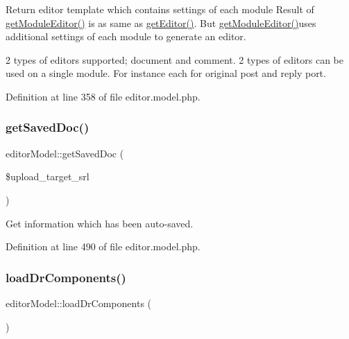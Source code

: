 Return editor template which contains settings of each module Result of \hyperlink{classeditorModel_af2b57078eb05b65c0094d5dac0186ca5}{get\+Module\+Editor()} is as same as \hyperlink{classeditorModel_a77477c0a6d333b3230f77904d96d93c5}{get\+Editor()}. But \hyperlink{classeditorModel_af2b57078eb05b65c0094d5dac0186ca5}{get\+Module\+Editor()}uses additional settings of each module to generate an editor. 

2 types of editors supported; document and comment. 2 types of editors can be used on a single module. For instance each for original post and reply port. 

Definition at line 358 of file editor.\+model.\+php.

\mbox{\label{classeditorModel_af9c4c2f7ba2d377b087cac08412b0baa}} 
\subsubsection{\texorpdfstring{get\+Saved\+Doc()}{getSavedDoc()}}
{\footnotesize\ttfamily editor\+Model\+::get\+Saved\+Doc (\begin{DoxyParamCaption}\item[{}]{\$upload\+\_\+target\+\_\+srl }\end{DoxyParamCaption})}



Get information which has been auto-\/saved. 



Definition at line 490 of file editor.\+model.\+php.

\mbox{\label{classeditorModel_a1ad866d4c1ab454b9d0b72c8d3cc29bd}} 
\subsubsection{\texorpdfstring{load\+Dr\+Components()}{loadDrComponents()}}
{\footnotesize\ttfamily editor\+Model\+::load\+Dr\+Components (\begin{DoxyParamCaption}{ }\end{DoxyParamCaption})}



